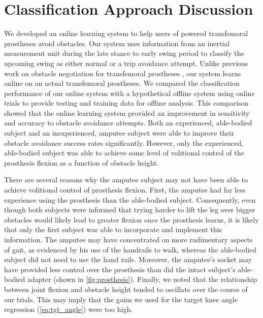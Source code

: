 \section{Classification Approach Discussion}

We developed an online learning system to help users of powered transfemoral
prostheses avoid obstacles. Our system uses information from an inertial
measurement unit during the late stance to early swing period to classify the
upcoming swing as either normal or a trip avoidance attempt. Unlike previous
work on obstacle negotiation for transfemoral prostheses
\citep{lawson2010stumble, zhang2011towards, shirota2014recovery}, our system
learns online on an actual transfemoral prostheses. We compared the
classification performance of our online system with a hypothetical offline
system using online trials to provide testing and training data for offline
analysis. This comparison showed that the online learning system provided an
improvement in sensitivity and accuracy to obstacle avoidance attempts. Both an
experienced, able-bodied subject and an inexperienced, amputee subject were able
to improve their obstacle avoidance success rates significantly. However, only
the experienced, able-bodied subject was able to achieve some level of
volitional control of the prosthesis flexion as a function of obstacle height.
                                  
There are several reasons why the amputee subject may not have been able to
achieve volitional control of prosthesis flexion. First, the amputee had far
less experience using the prosthesis than the able-bodied subject. Consequently,
even though both subjects were informed that trying harder to lift the leg over
bigger obstacles would likely lead to greater flexion once the prosthesis
learns, it is likely that only the first subject was able to incorporate and
implement this information. The amputee may have concentrated on more
rudimentary aspects of gait, as evidenced by his use of the handrails to walk,
whereas the able-bodied subject did not need to use the hand rails. Moreover,
the amputee's socket may have provided less control over the prosthesis than did
the intact subject's able-bodied adapter (shown in \cref{fig:prosthesis}).
Finally, we noted that the relationship between joint flexion and obstacle
height tended to oscillate over the course of our trials. This may imply that
the gains we used for the target knee angle regression (\cref{eq:tgt_angle})
were too high.


